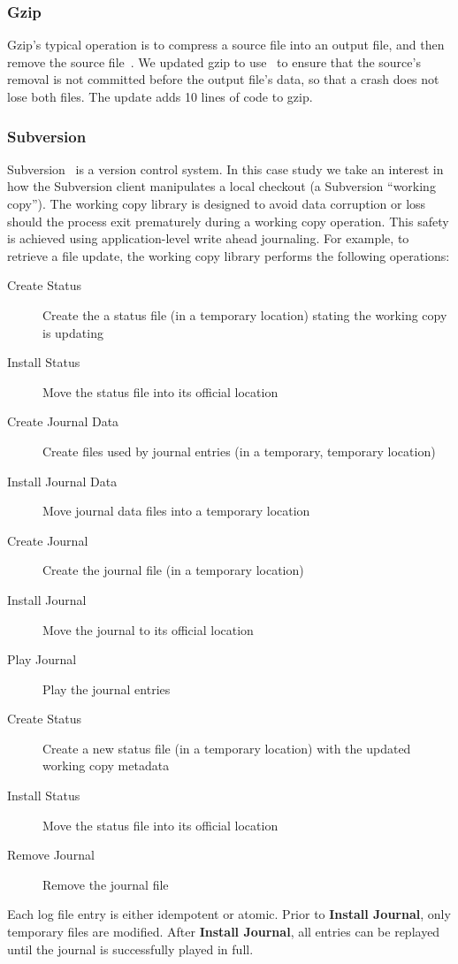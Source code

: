\subsubsection{Gzip}
\label{sec:opgroup:gzip}

Gzip's typical operation is to compress a source file into an output file,
and then remove the source file~\cite{gzip}.
%
We updated gzip to use \opgroups\ to ensure that the source's removal
is not committed before the output file's data, so that a crash does
not lose both files. The update adds 10 lines of code to gzip.

\subsubsection{Subversion}
\label{sec:opgroup:svn}

Subversion~\cite{svn} is a version control system.
%
In this case study we take an interest in how the Subversion client
manipulates a local checkout (a Subversion ``working copy'').
%
The working copy library is designed to avoid data corruption or loss
should the process exit prematurely during a working copy operation.
%
This safety is achieved using application-level write ahead
journaling.
%
For example, to retrieve a file update, the working copy library
performs the following operations:
%
\begin{description}
\item[Create Status] Create the a status file (in a temporary location)
  stating the working copy is updating
\item[Install Status] Move the status file into its official location
\item[Create Journal Data] Create files used by journal entries (in a
  temporary, temporary location)
\item[Install Journal Data] Move journal data files into a temporary
  location
\item[Create Journal] Create the journal file (in a temporary location)
\item[Install Journal] Move the journal to its official location
\item[Play Journal] Play the journal entries
\item[Create Status] Create a new status file (in a temporary location)
  with the updated working copy metadata
\item[Install Status] Move the status file into its official location
\item[Remove Journal] Remove the journal file
\end{description}
%
Each log file entry is either idempotent or atomic.
%
Prior to \textbf{Install Journal}, only temporary files are modified.
After \textbf{Install Journal}, all entries can be replayed until the
journal is successfully played in full.

